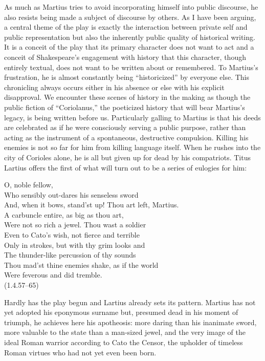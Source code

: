 As much as Martius tries to avoid incorporating himself into public discourse, he also resists being made a subject of discourse by others.
As I have been arguing, a central theme of the play is exactly the interaction between private self and public representation but also the inherently public quality of historical writing.
It is a conceit of the play that its primary character does not want to act and a conceit of Shakespeare's engagement with history that this character, though entirely textual, does not want to be written about or remembered. 
To Martius's frustration, he is almost constantly being ``historicized'' by everyone else.
This chronicling always occurs either in his absence or else with his explicit disapproval.
We encounter these scenes of history in the making as though the public fiction of ``Coriolanus,'' the poeticized history that will bear Martius's legacy, is being written before us.
Particularly galling to Martius is that his deeds are celebrated as if he were consciously serving a public purpose, rather than acting as the instrument of a spontaneous, destructive compulsion.
Killing his enemies is not so far for him from killing language itself.
When he rushes into the city of Corioles alone, he is all but given up for dead by his compatriots.
Titus Lartius offers the first of what will turn out to be a series of eulogies for him:
\begin{vq}
O, noble fellow,\\
Who sensibly out-dares his senseless sword\\
And, when it bows, stand'st up! Thou art left, Martius.\\
A carbuncle entire, as big as thou art,\\
Were not so rich a jewel. Thou wast a soldier\\
Even to Cato's wish, not fierce and terrible\\
Only in strokes, but with thy grim looks and\\
The thunder-like percussion of thy sounds\\
Thou mad'st thine enemies shake, as if the world\\
Were feverous and did tremble.\\
\hfill(1.4.57--65)
\end{vq}
Hardly has the play begun and Lartius already sets its pattern.
Martius has not yet adopted his eponymous surname but, presumed dead in his moment of triumph, he achieves here his apotheosis: more daring than his inanimate sword, more valuable to the state than a man-sized jewel, and the very image of the ideal Roman warrior according to Cato the Censor, the upholder of timeless Roman virtues who had not yet even been born.

